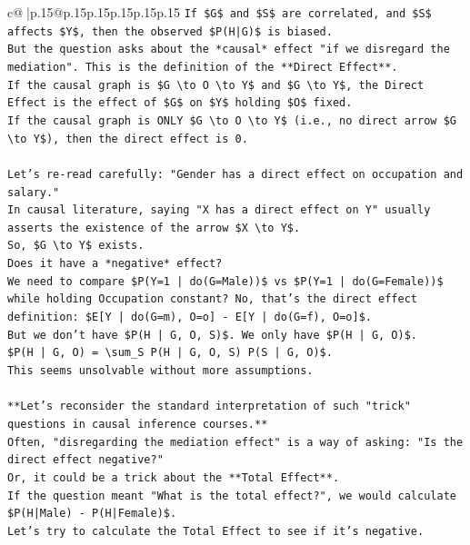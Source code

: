 \documentclass{article}
\begin{document}
{\begin{supertabular}{c@{$\;$}|p{.15\linewidth}@{}p{.15\linewidth}p{.15\linewidth}p{.15\linewidth}p{.15\linewidth}p{.15\linewidth}}
{{{\texttt{If \$G\$ and \$S\$ are correlated, and \$S\$ affects \$Y\$, then the observed \$P(H|G)\$ is biased.} \\
\texttt{But the question asks about the *causal* effect "if we disregard the mediation". This is the definition of the **Direct Effect**.} \\
\texttt{If the causal graph is \$G \textbackslash{}to O \textbackslash{}to Y\$ and \$G \textbackslash{}to Y\$, the Direct Effect is the effect of \$G\$ on \$Y\$ holding \$O\$ fixed.} \\
\texttt{If the causal graph is ONLY \$G \textbackslash{}to O \textbackslash{}to Y\$ (i.e., no direct arrow \$G \textbackslash{}to Y\$), then the direct effect is 0.} \\
\\ 
\texttt{Let's re{-}read carefully: "Gender has a direct effect on occupation and salary."} \\
\texttt{In causal literature, saying "X has a direct effect on Y" usually asserts the existence of the arrow \$X \textbackslash{}to Y\$.} \\
\texttt{So, \$G \textbackslash{}to Y\$ exists.} \\
\texttt{Does it have a *negative* effect?} \\
\texttt{We need to compare \$P(Y=1 | do(G=Male))\$ vs \$P(Y=1 | do(G=Female))\$ while holding Occupation constant? No, that's the direct effect definition: \$E{[}Y | do(G=m), O=o{]} {-} E{[}Y | do(G=f), O=o{]}\$.} \\
\texttt{But we don't have \$P(H | G, O, S)\$. We only have \$P(H | G, O)\$.} \\
\texttt{\$P(H | G, O) = \textbackslash{}sum\_S P(H | G, O, S) P(S | G, O)\$.} \\
\texttt{This seems unsolvable without more assumptions.} \\
\\ 
\texttt{**Let's reconsider the standard interpretation of such "trick" questions in causal inference courses.**} \\
\texttt{Often, "disregarding the mediation effect" is a way of asking: "Is the direct effect negative?"} \\
\texttt{Or, it could be a trick about the **Total Effect**.} \\
\texttt{If the question meant "What is the total effect?", we would calculate \$P(H|Male) {-} P(H|Female)\$.} \\
\texttt{Let's try to calculate the Total Effect to see if it's negative.} \\
}}}
\end{supertabular}}
\end{document}
